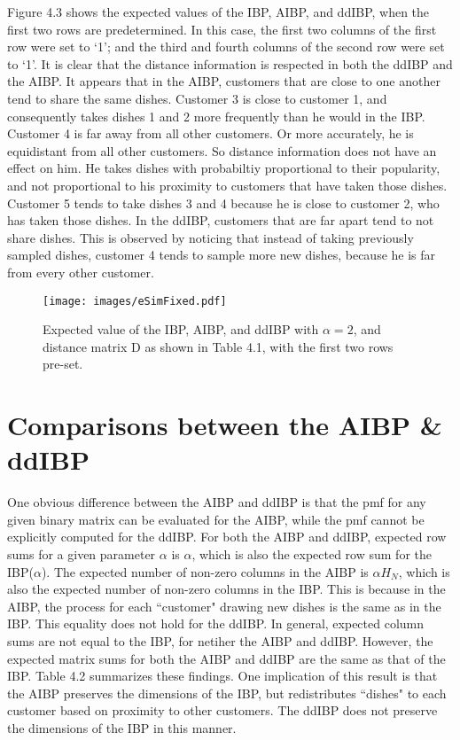 \noindent
Figure 4.3 shows the expected values of the IBP, AIBP, and ddIBP, when the
first two rows are predetermined. In this case, the first two columns of the
first row were set to `1'; and the third and fourth columns of the second row
were set to `1'. It is clear that the distance information is respected in both
the ddIBP and the AIBP. It appears that in the AIBP, customers that are close
to one another tend to share the same dishes. Customer 3 is close to customer
1, and consequently takes dishes 1 and 2 more frequently than he would in the
IBP.  Customer 4 is far away from all other customers. Or more accurately, he
is equidistant from all other customers. So distance information does not have
an effect on him. He takes dishes with probabiltiy proportional to their
popularity, and not proportional to his proximity to customers that have taken
those dishes. Customer 5 tends to take dishes 3 and 4 because he is close to
customer 2, who has taken those dishes. In the ddIBP, customers that are far
apart tend to not share dishes. This is observed by noticing that instead of 
taking previously sampled dishes, customer 4 tends to sample more new dishes,
because he is far from every other customer. 

\begin{figure}\begin{center}
  \texttt{[image: images/eSimFixed.pdf]}
  \caption{Expected value of the IBP, AIBP, and ddIBP with $\alpha=2$, and
           distance matrix D as shown in Table 4.1, with the first two rows
           pre-set.}
\end{center}\end{figure}


\section{Comparisons between the AIBP \& ddIBP}
One obvious difference between the AIBP and ddIBP is that the pmf for any given
binary matrix can be evaluated for the AIBP, while the pmf cannot be explicitly
computed for the ddIBP. For both the AIBP and ddIBP, expected row sums for a
given parameter $\alpha$ is $\alpha$, which is also the expected row sum for
the IBP($\alpha$).  The expected number of non-zero columns in the AIBP is
$\alpha H_N$, which is also the expected number of non-zero columns in the IBP.
This is because in the AIBP, the process for each ``customer" drawing new
dishes is the same as in the IBP. This equality does not hold for the ddIBP. In
general, expected column sums are not equal to the IBP, for netiher the AIBP and
ddIBP. However, the expected matrix sums for both the AIBP and ddIBP are the
same as that of the IBP. Table 4.2 summarizes these findings. One implication
of this result is that the AIBP preserves the dimensions of the IBP, but
redistributes ``dishes" to each customer based on proximity to other customers.
The ddIBP does not preserve the dimensions of the IBP in this manner. \\

